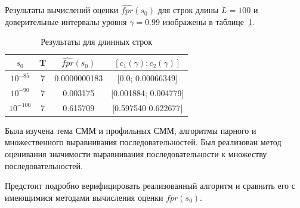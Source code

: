 \documentclass[specialist,
substylefile = spbu_report.rtx,
subf,href,colorlinks=true, 12pt]{disser}
\begin{document}
			 Результаты вычислений оценки $\widehat{fpr}(s_{0})$ для строк длины $L=100$ и доверительные интервалы уровня $\gamma = 0.99$ изображены в таблице~\ref{tb:2}.			 
			 
			 \begin{table}[H]
			 	\centering
			 	\caption{Результаты для длинных строк} \label{tb:2}
			 	\begin{tabular}{cccc}
			 		$s_{0}$&T&$\widehat{fpr}(s_{0})$&$[c_{1}(\gamma);c_{2}(\gamma)]$  \\ \hline
			 		$10^{-85}$&7&0.0000000183&[0.0; 0.00066349] \\
			 		$10^{-90}$&7&0.003175&[0.001884; 0.004779] \\ 
			 		$10^{-100}$&7&0.615709&[0.597540 0.622677] \\
			 	\end{tabular}
			 \end{table}
		
		\conclusion
			Была изучена тема СММ и профильных СММ, алгоритмы парного и множественного выравнивания последовательностей. Был реализован метод оценивания значимости выравнивания последовательности к множеству последовательностей.
			
			Предстоит подробно верифицировать реализованный алгоритм и сравнить его с имеющимися методами вычисления оценки ${fpr}(s_{0})$.

			\nocite{Stamp2021}
			\nocite{Jurafsky2021}
			\nocite{Rabiner1989}
			\nocite{Newberg2008}
			
			
						
\end{document}
